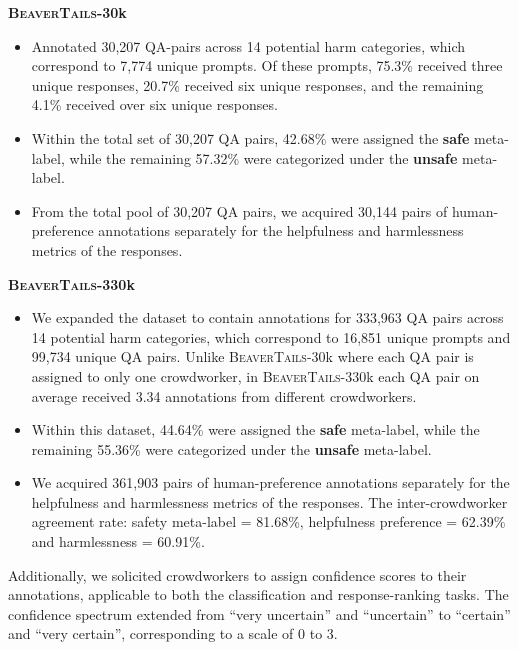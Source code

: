\documentclass{article}
\begin{document}
\textbf{\textsc{BeaverTails}-30k} 
\vspace{-0.5em}
\begin{itemize}[leftmargin=*]
\setlength\itemsep{-0.25em}
    \item Annotated 30,207 QA-pairs across 14 potential harm categories, which correspond to 7,774 unique prompts. Of these prompts, 75.3\% received three unique responses, 20.7\% received six unique responses, and the remaining 4.1\% received over six unique responses.
    \item Within the total set of 30,207 QA pairs, 42.68\% were assigned the \textbf{safe} meta-label, while the remaining 57.32\% were categorized under the \textbf{unsafe} meta-label.
    \item From the total pool of 30,207 QA pairs, we acquired 30,144 pairs of human-preference annotations separately for the helpfulness and harmlessness metrics of the responses.
\end{itemize}

\textbf{\textsc{BeaverTails}-330k}
\vspace{-0.5em}
\begin{itemize}[leftmargin=*]
\setlength\itemsep{-0.25em}
    \item We expanded the dataset to contain annotations for 333,963 QA pairs across 14 potential harm categories, which correspond to 16,851 unique prompts and 99,734 unique QA pairs. Unlike \textsc{BeaverTails}-30k where each QA pair is assigned to only one crowdworker, in \textsc{BeaverTails}-330k each QA pair on average received 3.34 annotations from different crowdworkers.
    \item Within this dataset, 44.64\% were assigned the \textbf{safe} meta-label, while the remaining 55.36\% were categorized under the \textbf{unsafe} meta-label.
    \item We acquired 361,903 pairs of human-preference annotations separately for the helpfulness and harmlessness metrics of the responses. The inter-crowdworker agreement rate: safety meta-label = 81.68\%, helpfulness preference = 62.39\% and harmlessness = 60.91\%.
\end{itemize}

\vspace{-0.5em}
Additionally, we solicited crowdworkers to assign confidence scores to their annotations, applicable to both the classification and response-ranking tasks. The confidence spectrum extended from ``very uncertain'' and ``uncertain'' to ``certain'' and ``very certain'', corresponding to a scale of 0 to 3.
\end{document}
